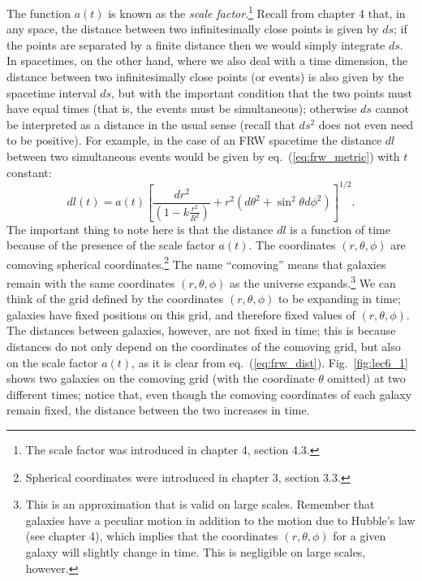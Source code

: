 \documentclass[11pt, a4paper,oneside,openright]{book}
\numberwithin{equation}{section}
\begin{document}
The function $a(t)$ is known as the {\it scale factor}.\footnote{The scale factor was introduced in chapter 4, section 4.3.} Recall from chapter 4 that, in any space, the distance between two infinitesimally close points is given by $ds$; if the points are separated by a finite distance then we would simply integrate $ds$. In spacetimes, on the other hand, where we also deal with a time dimension, the distance between two infinitesimally close points (or events) is also given by the spacetime interval $ds$, but with the important condition that the two points must have equal times (that is, the events must be simultaneous); otherwise $ds$ cannot be interpreted as a distance in the usual sense (recall that $ds^2$ does not even need to be positive). For example, in the case of an FRW spacetime the distance $dl$ between two simultaneous events would be given by eq.\ (\ref{eq:frw_metric}) with $t$ constant:
\begin{equation} \label{eq:frw_dist}
dl(t)=a(t)\left[\frac{dr^2}{\left(1-k\frac{r^2}{R^2}\right)}+r^2\left(d\theta^2+\sin^2\theta d\phi^2\right)\right]^{1/2}.
\end{equation}
The important thing to note here is that the distance $dl$ is a function of time because of the presence of the scale factor $a(t)$. The coordinates $(r,\theta,\phi)$ are comoving spherical coordinates.\footnote{Spherical coordinates were introduced in chapter 3, section 3.3.} The name ``comoving'' means that galaxies remain with the same coordinates $(r,\theta,\phi)$ as the universe expands.\footnote{This is an approximation that is valid on large scales. Remember that galaxies have a peculiar motion in addition to the motion due to Hubble's law (see chapter 4), which implies that the coordinates $(r,\theta,\phi)$ for a given galaxy will slightly change in time. This is negligible on large scales, however.} We can think of the grid defined by the coordinates $(r,\theta,\phi)$ to be expanding in time; galaxies have fixed positions on this grid, and therefore fixed values of $(r,\theta,\phi)$. The distances between galaxies, however, are not fixed in time; this is because distances do not only depend on the 
coordinates of the comoving grid, but also on the scale factor $a(t)$, as it is clear from eq.\ (\ref{eq:frw_dist}). Fig.\ \ref{fig:lec6_1} shows two galaxies on the comoving grid (with the coordinate $\theta$ omitted) at two different times; notice that, even though the comoving coordinates of each galaxy remain fixed, the distance between the two increases in time.
\end{document}
